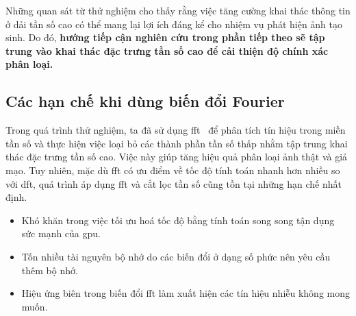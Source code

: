 Những quan sát từ thử nghiệm cho thấy rằng việc tăng cường khai thác thông tin ở dải tần số cao có thể mang lại lợi ích đáng kể cho nhiệm vụ phát hiện ảnh tạo sinh. Do đó, \textbf{hướng tiếp cận nghiên cứu trong phần tiếp theo sẽ tập trung vào khai thác đặc trưng tần số cao để cải thiện độ chính xác phân loại.}

\subsection{Các hạn chế khi dùng biến đổi Fourier}

Trong quá trình thử nghiệm, ta đã sử dụng \gls{fft}~\cite{Arunachalam2013TheFF} để phân tích tín hiệu trong miền tần số và thực hiện việc loại bỏ các thành phần tần số thấp nhằm tập trung khai thác đặc trưng tần số cao. Việc này giúp tăng hiệu quả phân loại ảnh thật và giả mạo. Tuy nhiên, mặc dù \gls{fft} có ưu điểm về tốc độ tính toán nhanh hơn nhiều so với \gls{dft}, quá trình áp dụng \gls{fft} và cắt lọc tần số cũng tồn tại những hạn chế nhất định.

\begin{itemize}
	\item Khó khăn trong việc tối ưu hoá tốc độ bằng tính toán song song tận dụng sức mạnh của \gls{gpu}.
	\item Tốn nhiều tài nguyên bộ nhớ do các biến đổi ở dạng số phức nên yêu cầu thêm bộ nhớ.
	\item Hiệu ứng biên trong biến đổi \gls{fft} làm xuất hiện các tín hiệu nhiễu không mong muốn.
\end{itemize}

%
%

